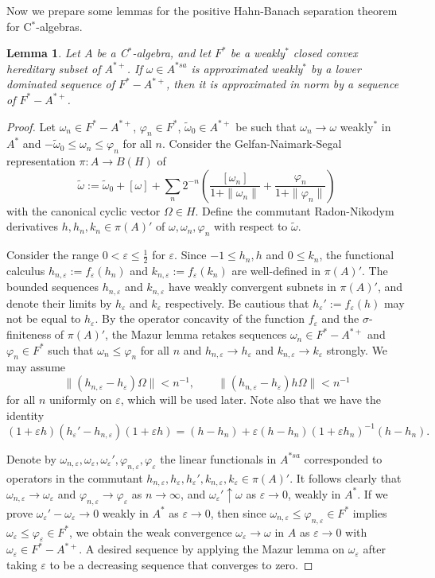 \documentclass[a4paper]{amsart}
\newcommand{\e}{\varepsilon}
\theoremstyle{plain}
\newtheorem{lem}[thm]{Lemma}
\theoremstyle{definition}
\begin{document}
Now we prepare some lemmas for the positive Hahn-Banach separation theorem for C$^*$-algebras.


\begin{lem}\label{lower dominated sequence}
Let $A$ be a C$^*$-algebra, and let $F^*$ be a weakly$^*$ closed convex hereditary subset of $A^{*+}$.
If $\omega\in A^{*sa}$ is approximated weakly$^*$ by a lower dominated sequence of $F^*-A^{*+}$, then it is approximated in norm by a sequence of $F^*-A^{*+}$.
\end{lem}
\begin{proof}
Let $\omega_n\in F^*-A^{*+}$, $\varphi_n\in F^*$, $\widetilde\omega_0\in A^{*+}$ be such that $\omega_n\to\omega$ weakly$^*$ in $A^*$ and $-\widetilde\omega_0\le\omega_n\le\varphi_n$ for all $n$.
Consider the Gelfan-Naimark-Segal representation $\pi:A\to B(H)$ of
\[\widetilde\omega:=\widetilde\omega_0+[\omega]+\sum_n2^{-n}\left(\frac{[\omega_n]}{1+\|\omega_n\|}+\frac{\varphi_n}{1+\|\varphi_n\|}\right)\]
with the canonical cyclic vector $\Omega\in H$.
Define the commutant Radon-Nikodym derivatives $h,h_n,k_n\in\pi(A)'$ of $\omega,\omega_n,\varphi_n$ with respect to $\widetilde\omega$.


Consider the range $0<\e\le\frac12$ for $\e$.
Since $-1\le h_n,h$ and $0\le k_n$, the functional calculus $h_{n,\e}:=f_\e(h_n)$ and $k_{n,\e}:=f_\e(k_n)$ are well-defined in $\pi(A)'$.
The bounded sequences $h_{n,\e}$ and $k_{n,\e}$ have weakly convergent subnets in $\pi(A)'$, and denote their limits by $h_\e$ and $k_\e$ respectively.
Be cautious that $h_\e':=f_\e(h)$ may not be equal to $h_\e$.
By the operator concavity of the function $f_\e$ and the $\sigma$-finiteness of $\pi(A)'$, the Mazur lemma retakes sequences $\omega_n\in F^*-A^{*+}$ and $\varphi_n\in F^*$ such that $\omega_n\le\varphi_n$ for all $n$ and $h_{n,\e}\to h_\e$ and $k_{n,\e}\to k_\e$ strongly.
We may assume
\[\|(h_{n,\e}-h_\e)\Omega\|<n^{-1},\qquad\|(h_{n,\e}-h_\e)h\Omega\|<n^{-1}\]
for all $n$ uniformly on $\e$, which will be used later.
Note also that we have the identity
\[(1+\e h)(h_\e'-h_{n,\e})(1+\e h)=(h-h_n)+\e(h-h_n)(1+\e h_n)^{-1}(h-h_n).\]


Denote by $\omega_{n,\e},\omega_\e,\omega_\e',\varphi_{n,\e},\varphi_\e$ the linear functionals in $A^{*sa}$ corresponded to operators in the commutant $h_{n,\e},h_\e,h_\e',k_{n,\e},k_\e\in\pi(A)'$.
It follows clearly that $\omega_{n,\e}\to\omega_\e$ and $\varphi_{n,\e}\to\varphi_\e$ as $n\to\infty$, and $\omega_\e'\uparrow\omega$ as $\e\to0$, weakly in $A^*$.
If we prove $\omega_\e'-\omega_\e\to0$ weakly in $A^*$ as $\e\to0$, then since $\omega_{n,\e}\le\varphi_{n,\e}\in F^*$ implies $\omega_\e\le\varphi_\e\in F^*$, we obtain the weak convergence $\omega_\e\to\omega$ in $A$ as $\e\to0$ with $\omega_\e\in F^*-A^{*+}$.
A desired sequence by applying the Mazur lemma on $\omega_\e$ after taking $\e$ to be a decreasing sequence that converges to zero.


\end{proof}
\end{document}

